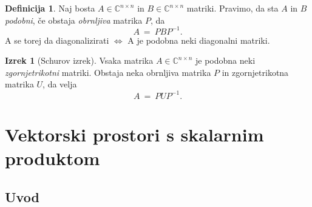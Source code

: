 \documentclass[11pt]{article}
\newcommand{\0}{\mathbf{0}}
\theoremstyle{definition}
\newtheorem{definicija}{Definicija}[section]
\theoremstyle{definition}
\theoremstyle{definition}
\newtheorem{izrek}{Izrek}[section]
\theoremstyle{definition}
\begin{document}
\begin{definicija}

Naj bosta $A \in \mathbb{C}^{n \times n}$ in $B \in \mathbb{C}^{n \times n}$ matriki. Pravimo, da sta $A$ in $B$ \textit{podobni}, če obstaja \textit{obrnljiva} matrika $P$, da 
$$A ~=~ PBP^{-1}.$$ A se torej da diagonalizirati $\iff$ A je podobna neki diagonalni matriki. 

\end{definicija}
\vspace{0.5cm}

\begin{izrek}[Schurov izrek]

Vsaka matrika $A \in \mathbb{C}^{n \times n}$ je podobna neki \textit{zgornjetrikotni} matriki. Obstaja neka obrnljiva matrika $P$ in zgornjetrikotna matrika $U$, da velja
$$A ~=~ PUP^{-1}.$$

\end{izrek}
\vspace{0.5cm}


\pagebreak


\section{Vektorski prostori s skalarnim produktom}
\vspace{0.5cm}


\subsection{Uvod}
\vspace{0.5cm}
\end{document}
